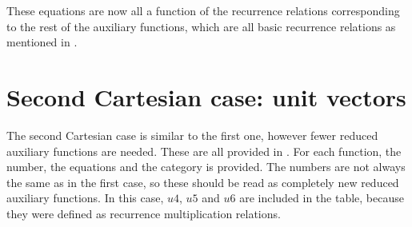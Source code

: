 \noindent
These equations are now all a function of the recurrence relations corresponding to the rest of the auxiliary functions, which are all basic recurrence relations as mentioned in . \\



\section{Second Cartesian case: unit vectors}
\label{sec:secCartApp}
The second Cartesian case is similar to the first one, however fewer reduced auxiliary functions are needed. These are all provided in . For each function, the number, the equations and the category is provided. The numbers are not always the same as in the first case, so these should be read as completely new reduced auxiliary functions. In this case, $u4$, $u5$ and $u6$ are included in the table, because they were defined as recurrence multiplication relations.


